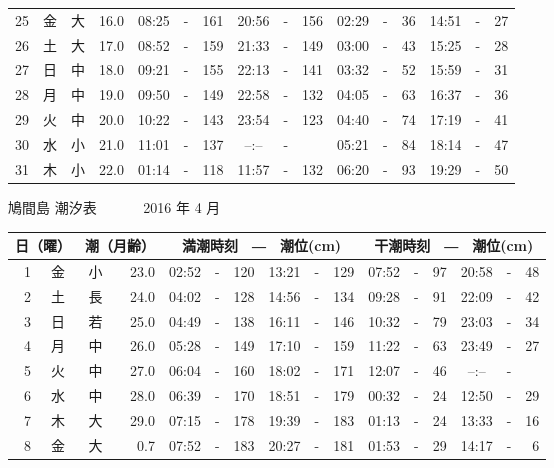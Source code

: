 \documentclass[12pt.a4j]{jsarticle}
\begin{document}
\begin{center}
\begin{table}[ht]
\begin{tabular}{|rc|cr|ccrccr|ccrccr|}
25 & 金 & 大 & 16.0 &  08:25 &-& 161  &  20:56 &-& 156  &   02:29 &-&  36  &   14:51 &-&  27  \\
26 & 土 & 大 & 17.0 &  08:52 &-& 159  &  21:33 &-& 149  &   03:00 &-&  43  &   15:25 &-&  28  \\
27 & 日 & 中 & 18.0 &  09:21 &-& 155  &  22:13 &-& 141  &   03:32 &-&  52  &   15:59 &-&  31  \\
28 & 月 & 中 & 19.0 &  09:50 &-& 149  &  22:58 &-& 132  &   04:05 &-&  63  &   16:37 &-&  36  \\
29 & 火 & 中 & 20.0 &  10:22 &-& 143  &  23:54 &-& 123  &   04:40 &-&  74  &   17:19 &-&  41  \\
30 & 水 & 小 & 21.0 &  11:01 &-& 137  &  --:-- &-&     &   05:21 &-&  84  &   18:14 &-&  47  \\
31 & 木 & 小 & 22.0 &  01:14 &-& 118  &  11:57 &-& 132  &   06:20 &-&  93  &   19:29 &-&  50  \\
   \hline
   \end{tabular}
\end{table}
\newpage
 {\LARGE 鳩間島  潮汐表　　　}
 {\large 2016 年  4 月}\\
 \begin{table}[ht]
    \begin{tabular}{|rc|cr|ccrccr|ccrccr|}
    \hline
    \multicolumn{2}{|c|}{日（曜）} & \multicolumn{2}{c|}{潮（月齢）} & \multicolumn{6}{c|}{満潮時刻　―　潮位(cm)} & \multicolumn{6}{c|}{干潮時刻　―　潮位(cm)} \\
 \hline
 1 & 金 & 小 & 23.0 &  02:52 &-& 120  &  13:21 &-& 129  &   07:52 &-&  97  &   20:58 &-&  48  \\
 2 & 土 & 長 & 24.0 &  04:02 &-& 128  &  14:56 &-& 134  &   09:28 &-&  91  &   22:09 &-&  42  \\
 3 & 日 & 若 & 25.0 &  04:49 &-& 138  &  16:11 &-& 146  &   10:32 &-&  79  &   23:03 &-&  34  \\
 4 & 月 & 中 & 26.0 &  05:28 &-& 149  &  17:10 &-& 159  &   11:22 &-&  63  &   23:49 &-&  27  \\
 5 & 火 & 中 & 27.0 &  06:04 &-& 160  &  18:02 &-& 171  &   12:07 &-&  46  &   --:-- &-&     \\
 6 & 水 & 中 & 28.0 &  06:39 &-& 170  &  18:51 &-& 179  &   00:32 &-&  24  &   12:50 &-&  29  \\
 7 & 木 & 大 & 29.0 &  07:15 &-& 178  &  19:39 &-& 183  &   01:13 &-&  24  &   13:33 &-&  16  \\
 8 & 金 & 大 &  0.7 &  07:52 &-& 183  &  20:27 &-& 181  &   01:53 &-&  29  &   14:17 &-&   6  \\

\end{tabular}
\end{table}
\end{center}
\end{document}
